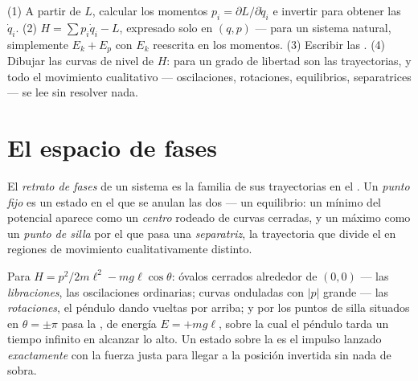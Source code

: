 \begin{method}\label{met:b3:hamiltonian-mechanics:recipe}
(1) A partir de $L$, calcular los momentos $p_i = \partial L/\partial\dot q_i$
e invertir para obtener las $\dot q_i$. (2) $H = \sum p_i\dot q_i - L$,
expresado solo en $(q, p)$ --- para un sistema natural, simplemente
$E_k + E_p$ con $E_k$ reescrita en los momentos. (3) Escribir las
. (4) Dibujar las curvas de nivel de $H$: para un grado
de libertad son las trayectorias, y todo el movimiento cualitativo
--- oscilaciones, rotaciones, equilibrios, separatrices --- se lee sin
resolver nada.
\end{method}

\section{El espacio de fases}

\begin{definition}\label{def:b3:hamiltonian-mechanics:portrait}
El \emph{retrato de fases} de un sistema es la familia de sus
trayectorias en el . Un \emph{punto fijo} es un estado en el
que se anulan las dos  --- un equilibrio: un mínimo del
potencial aparece como un \emph{centro} rodeado de curvas cerradas, y un
máximo como un \emph{punto de silla} por el que pasa una \emph{separatriz},
la trayectoria que divide el  en regiones de movimiento
cualitativamente distinto.
\end{definition}

\begin{example}\label{ex:b3:hamiltonian-mechanics:pendulum-portrait}
Para $H = p^2/2m\ell^2 - mg\ell\cos\theta$: óvalos cerrados alrededor de
$(0, 0)$ --- las \emph{libraciones}, las oscilaciones ordinarias; curvas
onduladas con $|p|$ grande --- las \emph{rotaciones}, el péndulo dando
vueltas por arriba; y por los puntos de silla situados en $\theta = \pm\pi$
pasa la , de energía $E = +mg\ell$, sobre la cual el péndulo tarda
un tiempo infinito en alcanzar lo alto. Un estado sobre la  es el
impulso lanzado \emph{exactamente} con la fuerza justa para llegar a la
posición invertida sin nada de sobra.
\end{example}

